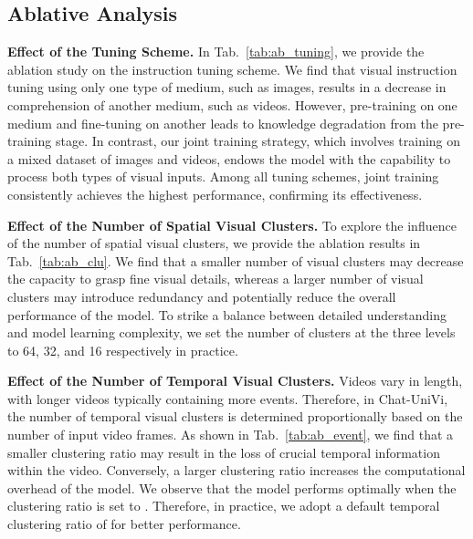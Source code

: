 \documentclass[10pt,twocolumn,letterpaper]{article}
\newcommand{\myparagraph}[1]{\textbf{#1}\hspace{1.8ex}}
\begin{document}
\subsection{Ablative Analysis}
\noindent \myparagraph{Effect of the Tuning Scheme.} 
In Tab.~\ref{tab:ab_tuning}, we provide the ablation study on the instruction tuning scheme. We find that visual instruction tuning using only one type of medium, such as images, results in a decrease in comprehension of another medium, such as videos. However, pre-training on one medium and fine-tuning on another leads to knowledge degradation from the pre-training stage. In contrast, our joint training strategy, which involves training on a mixed dataset of images and videos, endows the model with the capability to process both types of visual inputs. Among all tuning schemes, joint training consistently achieves the highest performance, confirming its effectiveness.

\noindent \myparagraph{Effect of the Number of Spatial Visual Clusters.} 
To explore the influence of the number of spatial visual clusters, we provide the ablation results in Tab.~\ref{tab:ab_clu}. We find that a smaller number of visual clusters may decrease the capacity to grasp fine visual details, whereas a larger number of visual clusters may introduce redundancy and potentially reduce the overall performance of the model. To strike a balance between detailed understanding and model learning complexity, we set the number of clusters at the three levels to 64, 32, and 16 respectively in practice.

\noindent \myparagraph{Effect of the Number of Temporal Visual Clusters.} Videos vary in length, with longer videos typically containing more events. Therefore, in Chat-UniVi, the number of temporal visual clusters is determined proportionally based on the number of input video frames. As shown in Tab.~\ref{tab:ab_event}, we find that a smaller clustering ratio may result in the loss of crucial temporal information within the video. Conversely, a larger clustering ratio increases the computational overhead of the model. We observe that the model performs optimally when the clustering ratio is set to . Therefore, in practice, we adopt a default temporal clustering ratio of  for better performance.
\end{document}
